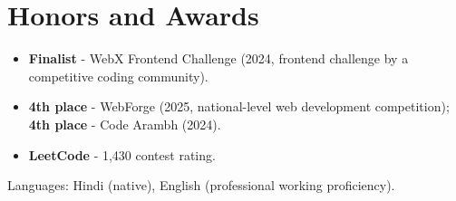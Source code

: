 \documentclass[11pt,a4paper,sans]{moderncv}
\begin{document}
\section{Honors and Awards}
\vspace{1pt}
\begin{itemize}
    \item {\textbf{Finalist} - WebX Frontend Challenge (2024, frontend challenge by a competitive coding community).}
    \item {\textbf{4th place} - WebForge (2025, national-level web development competition); \textbf{4th place} - Code Arambh (2024).}
    \item {\textbf{LeetCode} - 1,430 contest rating.}
\end{itemize}


\vspace{1pt}
\small{Languages: Hindi (native), English (professional working proficiency).}
\end{document}
